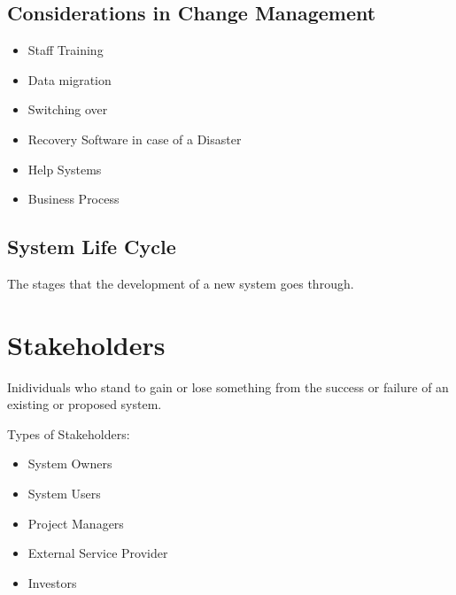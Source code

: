 \documentclass[12pt,fleqn]{book} %
\begin{document}
\begin{center}
\end{center}

\subsection{Considerations in Change Management}
\begin{itemize}
  \item Staff Training
  \item Data migration
  \item Switching over
  \item Recovery Software in case of a Disaster
  \item Help Systems
  \item Business Process
\end{itemize}

\subsection{System Life Cycle}
\begin{definition}
  The stages that the development of a new system goes through.
\end{definition}\par

\begin{center}
\end{center}

\section{Stakeholders}
\begin{definition}[Stakeholder]
  Inidividuals who stand to gain or lose something from the success or failure
  of an existing or proposed system.
\end{definition}\par

\begin{example}
  Types of Stakeholders:
  \begin{itemize}
    \item System Owners
    \item System Users
    \item Project Managers
    \item External Service Provider
    \item Investors
  \end{itemize}
\end{example}
\end{document}
